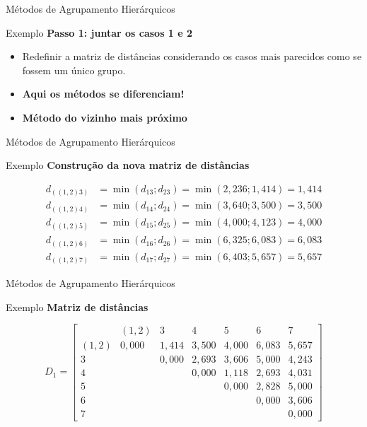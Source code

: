 \documentclass[
  ignorenonframetext,
  aspectratio=169,
]{beamer}
\begin{document}
\begin{frame}{Métodos de Agrupamento Hierárquicos}
\protect{}\label{muxe9todos-de-agrupamento-hieruxe1rquicos-15}
\begin{block}{Exemplo}
\protect{}\label{exemplo-4}
\textbf{Passo 1: juntar os casos 1 e 2}

\begin{itemize}
\item
  Redefinir a matriz de distâncias considerando os casos mais parecidos
  como se fossem um único grupo.
\item
  \textbf{Aqui os métodos se diferenciam!}
\item
  \textbf{Método do vizinho mais próximo}
\end{itemize}
\end{block}
\end{frame}

\begin{frame}{Métodos de Agrupamento Hierárquicos}
\protect{}\label{muxe9todos-de-agrupamento-hieruxe1rquicos-16}
\begin{block}{Exemplo}
\protect{}\label{exemplo-5}
\textbf{Construção da nova matriz de distâncias}

\[
\begin{aligned}
d_{((1,2)3)} &=  \min(d_{13};d_{23}) = \min(2,236; 1,414) = 1,414 \\[6pt]
d_{((1,2)4)} &=  \min(d_{14};d_{24}) = \min(3,640; 3,500) = 3,500 \\[6pt]
d_{((1,2)5)} &=  \min(d_{15};d_{25}) = \min(4,000; 4,123) = 4,000 \\[6pt]
d_{((1,2)6)} &=  \min(d_{16};d_{26}) = \min(6,325; 6,083) = 6,083 \\[6pt]
d_{((1,2)7)} &=  \min(d_{17};d_{27}) = \min(6,403; 5,657) = 5,657
\end{aligned}
\]
\end{block}
\end{frame}

\begin{frame}{Métodos de Agrupamento Hierárquicos}
\protect{}\label{muxe9todos-de-agrupamento-hieruxe1rquicos-17}
\begin{block}{Exemplo}
\protect{}\label{exemplo-6}
\textbf{Matriz de distâncias}

\[D_1 = \left[ \begin{matrix}
&(1,2)&3&4&5&6&7\\ 
(1,2)& 0,000 & 1,414 & 3,500 & 4,000 & 6,083 & 5,657 \\
3  &  & 0,000 & 2,693 & 3,606 & 5,000 & 4,243 \\
4  &  &  & 0,000 & 1,118 & 2,693 & 4,031 \\
5 &  &  &  & 0,000 & 2,828 & 5,000 \\
6  &  &  &  &  & 0,000 & 3,606 \\
7  &  &  &  &  &  & 0,000
                    \end{matrix} \right]\]
\end{block}
\end{frame}
\end{document}
